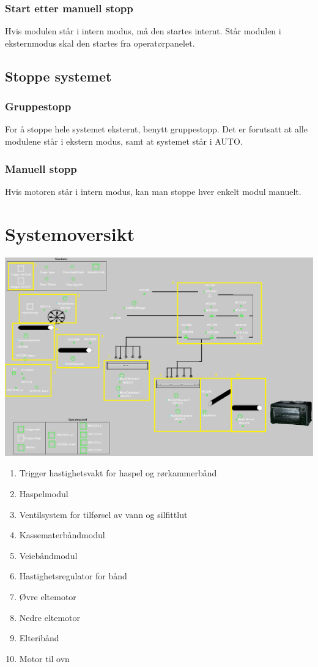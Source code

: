 \subsubsection*{Start etter manuell stopp}
Hvis modulen står i intern modus, må den startes internt. Står modulen i eksternmodus skal den startes fra operatørpanelet. 

\subsection{Stoppe systemet}
\subsubsection*{Gruppestopp}
For å stoppe hele systemet eksternt, benytt gruppestopp. Det er forutsatt at alle modulene står i ekstern modus, samt at systemet står i AUTO. 
\subsubsection*{Manuell stopp}
Hvis motoren står i intern modus, kan man stoppe hver enkelt modul manuelt. 

\newpage

\section{Systemoversikt}

\includegraphics[scale=0.4]{oversikt.png}

\begin{enumerate}
  \item Trigger hastighetsvakt for haspel og rørkammerbånd
  \item Haspelmodul
  \item Ventilsystem for tilførsel av vann og silfittlut
  \item Kassematerbåndmodul
  \item Veiebåndmodul
  \item Hastighetsregulator for bånd
  \item Øvre eltemotor
  \item Nedre eltemotor
  \item Elteribånd
  \item Motor til ovn
\end{enumerate}
